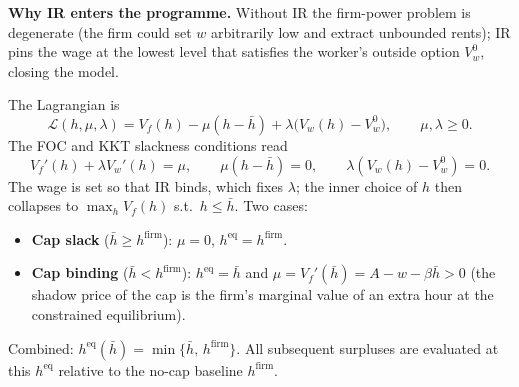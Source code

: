 \documentclass[a4paper,11pt]{article}
\begin{document}
\textbf{Why IR enters the programme.} Without IR the firm-power problem is degenerate (the firm could set $w$ arbitrarily low and extract unbounded rents); IR pins the wage at the lowest level that satisfies the worker's outside option $V_w^{0}$, closing the model.

The Lagrangian is
\[
\mathcal{L}(h,\mu,\lambda)=V_f(h)-\mu(h-\bar h)+\lambda\bigl(V_w(h)-V_w^{0}\bigr),\qquad \mu,\lambda\ge 0.
\]
The FOC and KKT slackness conditions read
\[
V_f'(h)+\lambda V_w'(h)=\mu,\qquad \mu(h-\bar h)=0,\qquad \lambda(V_w(h)-V_w^{0})=0.
\]
The wage is set so that IR binds, which fixes $\lambda$; the inner choice of $h$ then collapses to $\max_h V_f(h)$ s.t.\ $h\le\bar h$. Two cases:
\begin{itemize}\itemsep0pt
\item \textbf{Cap slack} ($\bar h\ge h^{\mathrm{firm}}$): $\mu=0$, $h^{\mathrm{eq}}=h^{\mathrm{firm}}$.
\item \textbf{Cap binding} ($\bar h<h^{\mathrm{firm}}$): $h^{\mathrm{eq}}=\bar h$ and $\mu=V_f'(\bar h)=A-w-\beta\bar h>0$ (the shadow price of the cap is the firm's marginal value of an extra hour at the constrained equilibrium).
\end{itemize}
Combined: $h^{\mathrm{eq}}(\bar h)=\min\{\bar h,\,h^{\mathrm{firm}}\}$. All subsequent surpluses are evaluated at this $h^{\mathrm{eq}}$ relative to the no-cap baseline $h^{\mathrm{firm}}$.
\end{document}
